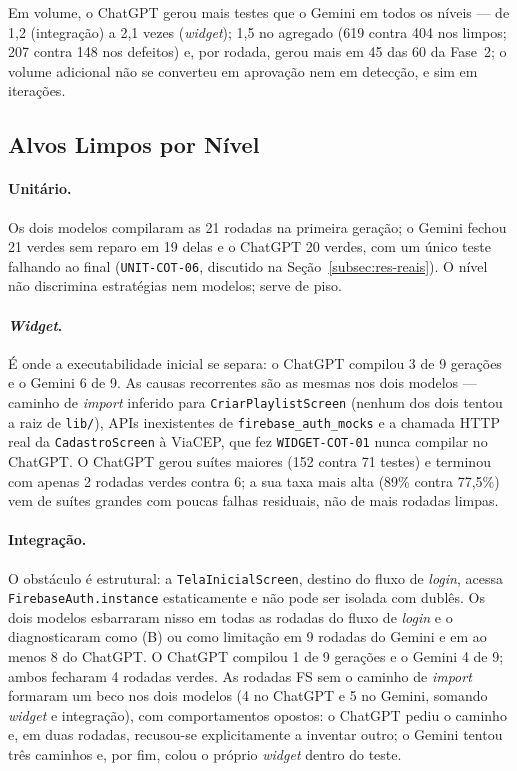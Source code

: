 \documentclass[12pt]{article}
\begin{document}
Em volume, o ChatGPT gerou mais testes que o Gemini em todos os níveis ---
de 1,2 (integração) a 2,1 vezes (\textit{widget}); 1,5 no agregado (619
contra 404 nos limpos; 207 contra 148 nos defeitos) e, por rodada,
gerou mais em 45 das 60 da Fase~2; o volume adicional não se converteu em
aprovação nem em detecção, e sim em iterações.

\subsection{Alvos Limpos por Nível}
\label{subsec:res-limpos}

\paragraph{Unitário.} Os dois modelos compilaram as 21 rodadas na primeira
geração; o Gemini fechou 21 verdes sem reparo em 19 delas e o ChatGPT 20
verdes, com um único teste falhando ao final (\texttt{UNIT-COT-06}, discutido
na Seção~\ref{subsec:res-reais}). O nível não discrimina estratégias nem
modelos; serve de piso.

\paragraph{\textit{Widget}.} É onde a executabilidade inicial se separa: o
ChatGPT compilou 3 de 9 gerações e o Gemini 6 de 9. As causas recorrentes
são as mesmas nos dois modelos --- caminho de \textit{import} inferido para
\texttt{CriarPlaylistScreen} (nenhum dos dois tentou a raiz de \texttt{lib/}),
APIs inexistentes de \texttt{firebase\_auth\_mocks} e a chamada HTTP real da
\texttt{CadastroScreen} à ViaCEP, que fez \texttt{WIDGET-COT-01} nunca
compilar no ChatGPT. O ChatGPT gerou suítes maiores (152 contra 71 testes) e
terminou com apenas 2 rodadas verdes contra 6; a sua taxa mais alta (89\%
contra 77,5\%) vem de suítes grandes com poucas falhas residuais, não de mais
rodadas limpas.

\paragraph{Integração.} O obstáculo é estrutural: a \texttt{TelaInicialScreen},
destino do fluxo de \textit{login}, acessa \texttt{FirebaseAuth.instance}
estaticamente e não pode ser isolada com dublês. Os dois modelos esbarraram
nisso em todas as rodadas do fluxo de \textit{login} e o diagnosticaram como
(B) ou como limitação em 9 rodadas do Gemini e em ao menos 8 do ChatGPT. O
ChatGPT compilou 1 de 9 gerações e o Gemini 4 de 9; ambos fecharam 4 rodadas
verdes. As rodadas FS sem o caminho de \textit{import} formaram um beco nos
dois modelos (4 no ChatGPT e 5 no Gemini, somando \textit{widget} e
integração), com comportamentos opostos: o ChatGPT pediu o caminho e, em duas
rodadas, recusou-se explicitamente a inventar outro; o Gemini tentou três
caminhos e, por fim, colou o próprio \textit{widget} dentro do teste.
\end{document}

